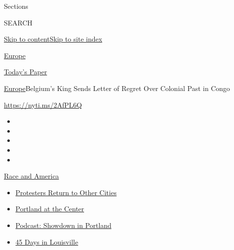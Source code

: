 Sections

SEARCH

\protect\hyperlink{site-content}{Skip to
content}\protect\hyperlink{site-index}{Skip to site index}

\href{https://www.nytimes.com/section/world/europe}{Europe}

\href{https://myaccount.nytimes.com/auth/login?response_type=cookie\&client_id=vi}{}

\href{https://www.nytimes.com/section/todayspaper}{Today's Paper}

\href{/section/world/europe}{Europe}\textbar{}Belgium's King Sends
Letter of Regret Over Colonial Past in Congo

\url{https://nyti.ms/2AfPL6Q}

\begin{itemize}
\item
\item
\item
\item
\item
\end{itemize}

\href{https://www.nytimes.com/news-event/george-floyd-protests-minneapolis-new-york-los-angeles?action=click\&pgtype=Article\&state=default\&region=TOP_BANNER\&context=storylines_menu}{Race
and America}

\begin{itemize}
\tightlist
\item
  \href{https://www.nytimes.com/2020/07/26/us/protests-portland-seattle-trump.html?action=click\&pgtype=Article\&state=default\&region=TOP_BANNER\&context=storylines_menu}{Protesters
  Return to Other Cities}
\item
  \href{https://www.nytimes.com/2020/07/24/us/portland-oregon-protests-white-race.html?action=click\&pgtype=Article\&state=default\&region=TOP_BANNER\&context=storylines_menu}{Portland
  at the Center}
\item
  \href{https://www.nytimes.com/2020/07/23/podcasts/the-daily/portland-protests.html?action=click\&pgtype=Article\&state=default\&region=TOP_BANNER\&context=storylines_menu}{Podcast:
  Showdown in Portland}
\item
  \href{https://www.nytimes.com/interactive/2020/07/16/us/black-lives-matter-protests-louisville-breonna-taylor.html?action=click\&pgtype=Article\&state=default\&region=TOP_BANNER\&context=storylines_menu}{45
  Days in Louisville}
\end{itemize}

